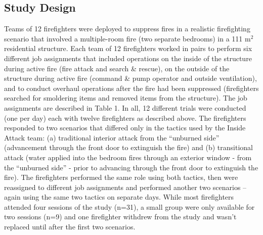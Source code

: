 \documentclass[12pt,oneside]{book}
\begin{document}
\subsection{Study Design}
Teams of 12 firefighters were deployed to suppress fires in a realistic firefighting scenario that involved a multiple-room fire (two separate bedrooms) in a 111 m$^2$ residential structure. Each team of 12 firefighters worked in pairs to perform six different job assignments that included operations on the inside of the structure during active fire (fire attack and search \& rescue), on the outside of the structure during active fire (command \& pump operator and outside ventilation), and to conduct overhaul operations after the fire had been suppressed (firefighters searched for smoldering items and removed items from the structure).  The job assignments are described in Table 1. 
In all, 12 different trials were conducted (one per day) each with twelve firefighters as described above.  The firefighters responded to two scenarios that differed only in the tactics used by the Inside Attack team: (a) traditional interior attack from the “unburned side” (advancement through the front door to extinguish the fire) and (b) transitional attack (water applied into the bedroom fires through an exterior window - from the “unburned side” - prior to advancing through the front door to extinguish the fire).  The firefighters performed the same role using both tactics, then were reassigned to different job assignments and performed another two scenarios – again using the same two tactics on separate days.  While most firefighters attended four sessions of the study (n=31), a small group were only available for two sessions (n=9) and one firefighter withdrew from the study and wasn't replaced until after the first two scenarios.
\end{document}
